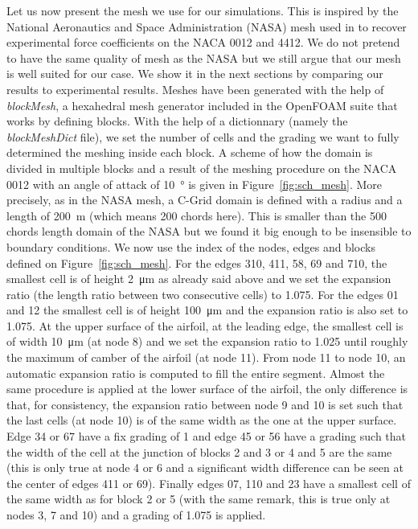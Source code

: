 \begin{subappendices}
	Let us now present the mesh we use for our simulations. This is inspired by the National Aeronautics and Space Administration (NASA) mesh used in \cite{TMR} to recover experimental force coefficients on the NACA 0012 and 4412. We do not pretend to have the same quality of mesh as the NASA but we still argue that our mesh is well suited for our case. We show it in the next sections by comparing our results to experimental results. Meshes have been generated with the help of \emph{blockMesh}, a hexahedral mesh generator included in the OpenFOAM suite that works by defining blocks. With the help of a dictionnary (namely the \emph{blockMeshDict} file), we set the number of cells and the grading we want to fully determined the meshing inside each block. A scheme of how the domain is divided in multiple blocks and a result of the meshing procedure on the NACA 0012 with an angle of attack of \SI{10}{\degree} is given in Figure~\ref{fig:sch_mesh}. More precisely, as in the NASA mesh, a C-Grid domain is defined with a radius and a length of \SI{200}{\meter} (which means 200 chords here). This is smaller than the 500 chords length domain of the NASA but we found it big enough to be insensible to boundary conditions. We now use the index of the nodes, edges and blocks defined on Figure~\ref{fig:sch_mesh}. For the edges 310, 411, 58, 69 and 710, the smallest cell is of height \SI{2}{\micro\meter} as already said above and we set the expansion ratio (the length ratio between two consecutive cells) to 1.075. For the edges 01 and 12 the smallest cell is of height \SI{100}{\micro\meter} and the expansion ratio is also set to 1.075. At the upper surface of the airfoil, at the leading edge, the smallest cell is of width \SI{10}{\micro\meter} (at node 8) and we set the expansion ratio to 1.025 until roughly the maximum of camber of the airfoil (at node 11). From node 11 to node 10, an automatic expansion ratio is computed to fill the entire segment. Almost the same procedure is applied at the lower surface of the airfoil, the only difference is that, for consistency, the expansion ratio between node 9 and 10 is set such that the last cells (at node 10) is of the same width as the one at the upper surface. Edge 34 or 67 have a fix grading of 1 and edge 45 or 56 have a grading such that the width of the cell at the junction of blocks 2 and 3 or 4 and 5 are the same (this is only true at node 4 or 6 and a significant width difference can be seen at the center of edges 411 or 69). Finally edges 07, 110 and 23 have a smallest cell of the same width as for block 2 or 5 (with the same remark, this is true only at nodes 3, 7 and 10) and a grading of 1.075 is applied.
	

\end{subappendices}
